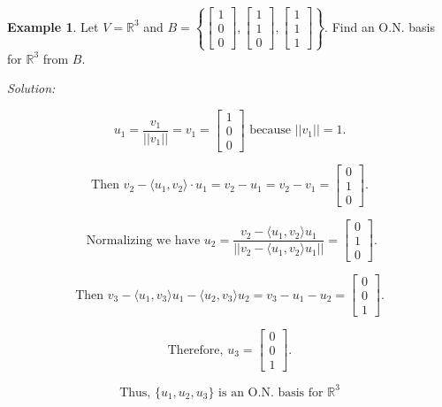 \documentclass[12pt]{article}
\theoremstyle{definition}
\newtheorem*{example}{Example}
\begin{document}
\begin{example}
Let $V = \mathbb{R}^3$ and $\displaystyle B = \left\{ \begin{bmatrix} 1 \\ 0 \\ 0 \end{bmatrix},
\begin{bmatrix} 1 \\ 1 \\ 0 \end{bmatrix}, \begin{bmatrix} 1 \\ 1 \\ 1 \end{bmatrix} \right\}$.
Find an O.N. basis for $\mathbb{R}^3$ from $B$.

\vspace{0.2cm}

\noindent \textit{Solution:}

\[ u_1 = \frac{v_1}{|| v_1 ||} = v_1 = \begin{bmatrix} 1 \\ 0 \\ 0 \end{bmatrix} \text{ because } || v_1 || = 1.\]


\[
\text{Then } v_2 - \langle u_1, v_2 \rangle \cdot u_1 = v_2 - u_1 = v_2 - v_1 = \begin{bmatrix} 0 \\ 1 \\ 0 \end{bmatrix}.
\]

\[
\text{ Normalizing we have } u_2 = \frac{v_2 - \langle u_1, v_2 \rangle u_1}{||v_2 - \langle u_1, v_2 \rangle u_1||}
= \begin{bmatrix} 0 \\ 1 \\ 0 \end{bmatrix}. 
\]

\[
\text{Then } v_3 - \langle u_1, v_3 \rangle u_1 - \langle u_2, v_3 \rangle u_2 = v_3 - u_1 - u_2 =
\begin{bmatrix} 0 \\ 0 \\ 1 \end{bmatrix}.
\]

\[\text{Therefore, } u_3 = \begin{bmatrix} 0 \\ 0 \\ 1 \end{bmatrix}.
\]

\[\text{Thus, } \{u_1, u_2, u_3\} \text{ is an O.N. basis for } \mathbb{R}^3\]

\end{example}
\end{document}

